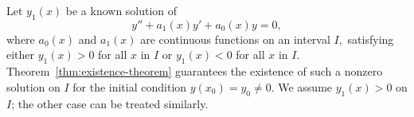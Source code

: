 
Let $y_1(x)$ be a known  solution of 	
\begin{equation}\label{eq:second order-Linear_homo-de-2}
	y'' + a_1(x)y' + a_0(x)y = 0,
\end{equation}
where \( a_0(x) \) and \( a_1(x) \) are continuous functions on an interval $I,$  satisfying either $y_1(x)>0$ for all $x$ in $I$ or $y_1(x) <0$ for all $x$ in $I$.  Theorem~\ref{thm:existence-theorem} guarantees the existence of such a nonzero solution on $I$ for the initial condition $y(x_0) = y_0 \neq 0.$  We assume $y_1(x) > 0$ on $I$; the other case can be treated similarly.


